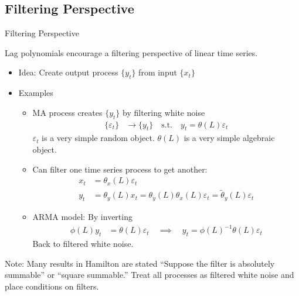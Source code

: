 \documentclass[handout]{beamer}
\newcommand{\ra}{\rightarrow}
\begin{document}
\subsection{Filtering Perspective}


\begin{frame}[shrink]{Filtering Perspective}

Lag polynomials encourage a \alert{filtering} perspective of linear time
series.
\begin{itemize}
  \item \alert{Idea}:
    Create output process $\{y_t\}$ from input $\{x_t\}$
  \pause
  \item \alert{Examples}
    \begin{itemize}
      \item MA process creates $\{y_t\}$ by filtering white
        noise
        \begin{align*}
          \{\varepsilon_t\} &\ra \{y_t\}
          \quad\text{s.t.}\quad
          y_t
          =
          \theta(L)\varepsilon_t
        \end{align*}
        $\varepsilon_t$ is a very simple random object.
        $\theta(L)$ is a very simple algebraic object.

      \pause
      \item
        Can filter one time series process to get another:
        \begin{align*}
          x_t &= \theta_x(L)\varepsilon_t
          \\
          y_t &= \theta_y(L)x_t
          = \theta_y(L)\theta_x(L)\varepsilon_t
          = \tilde{\theta}_y(L)\varepsilon_t
        \end{align*}

      \pause
      \item
        ARMA model: By inverting
        \begin{align*}
          \phi(L)y_t &= \theta(L)\varepsilon_t
          \quad\implies\quad
          y_t = \phi(L)^{-1}\theta(L)\varepsilon_t
        \end{align*}
        Back to filtered white noise.
    \end{itemize}
\end{itemize}
\pause
\alert{Note}: Many results in Hamilton are stated ``Suppose the filter
is absolutely summable'' or ``square summable.'' Treat all processes as
filtered white noise and place conditions on filters.
\end{frame}
\end{document}
